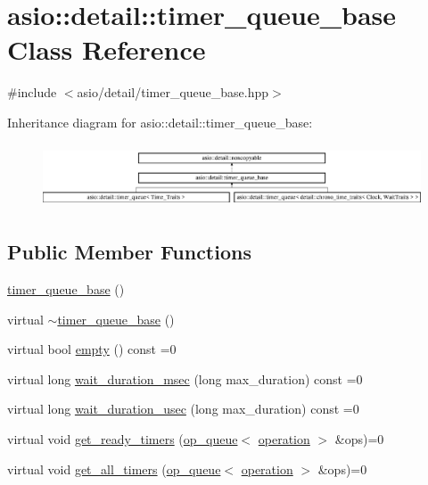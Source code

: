 \hypertarget{classasio_1_1detail_1_1timer__queue__base}{}\section{asio\+:\+:detail\+:\+:timer\+\_\+queue\+\_\+base Class Reference}
\label{classasio_1_1detail_1_1timer__queue__base}


{\ttfamily \#include $<$asio/detail/timer\+\_\+queue\+\_\+base.\+hpp$>$}

Inheritance diagram for asio\+:\+:detail\+:\+:timer\+\_\+queue\+\_\+base\+:\begin{figure}[H]
\begin{center}
\leavevmode
\includegraphics[height=1.926605cm]{classasio_1_1detail_1_1timer__queue__base}
\end{center}
\end{figure}
\subsection*{Public Member Functions}
\begin{DoxyCompactItemize}
\item 
\hyperlink{classasio_1_1detail_1_1timer__queue__base_abda2c964f09d1f40bbd7a47c2de84d84}{timer\+\_\+queue\+\_\+base} ()
\item 
virtual \hyperlink{classasio_1_1detail_1_1timer__queue__base_a502786b2df15d059d7e7cfdb32b1e0fc}{$\sim$timer\+\_\+queue\+\_\+base} ()
\item 
virtual bool \hyperlink{classasio_1_1detail_1_1timer__queue__base_a48dca28c569456158fc7b911bfc73fd9}{empty} () const  =0
\item 
virtual long \hyperlink{classasio_1_1detail_1_1timer__queue__base_addbb860de0d5e7dab3d7c874bced11dc}{wait\+\_\+duration\+\_\+msec} (long max\+\_\+duration) const  =0
\item 
virtual long \hyperlink{classasio_1_1detail_1_1timer__queue__base_a0ede8e7cf51da9a53ffc4b76e4ddeb9f}{wait\+\_\+duration\+\_\+usec} (long max\+\_\+duration) const  =0
\item 
virtual void \hyperlink{classasio_1_1detail_1_1timer__queue__base_aae31209e8eeb64d903fc6254df30ce85}{get\+\_\+ready\+\_\+timers} (\hyperlink{classasio_1_1detail_1_1op__queue}{op\+\_\+queue}$<$ \hyperlink{namespaceasio_1_1detail_a338968609bec20e37145309f8f9ec936}{operation} $>$ \&ops)=0
\item 
virtual void \hyperlink{classasio_1_1detail_1_1timer__queue__base_a7dfa566766b88bc5143d42f79b1883a6}{get\+\_\+all\+\_\+timers} (\hyperlink{classasio_1_1detail_1_1op__queue}{op\+\_\+queue}$<$ \hyperlink{namespaceasio_1_1detail_a338968609bec20e37145309f8f9ec936}{operation} $>$ \&ops)=0
\end{DoxyCompactItemize}
